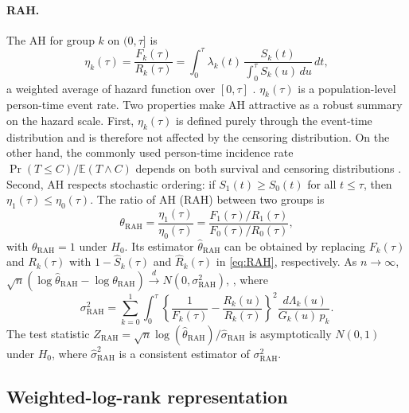 \documentclass[12pt]{article}
\newcommand{\RAH}{\mathrm{RAH}}
\newcommand{\dd}{\,d}
\begin{document}
\paragraph{RAH.}
The AH for group $k$ on $(0,\tau]$ is
\begin{equation*}\label{eq:AH}
  \eta_k(\tau)=\frac{F_k(\tau)}{R_k(\tau)}
              =\int_0^\tau\lambda_k(t)\,
               \frac{S_k(t)}{\int_0^\tau S_k(u)\dd u}\dd t,
\end{equation*}
a weighted average of hazard function over $[0, \tau]$ \citep{Uno2023}.
$\eta_k(\tau)$ is a population-level person-time event rate.
Two properties make
AH attractive as a robust summary on the hazard scale.  First, $\eta_k(\tau)$ is defined purely through the event-time distribution
and is therefore not affected by the censoring distribution. On the other hand, the commonly used person-time incidence rate $\Pr(T\le C)/\mathbb{E}(T\wedge C)$ depends on both survival and censoring distributions \citep{Uno2023}.
Second, AH respects stochastic ordering: if $S_1(t)\ge S_0(t)$ for all
$t\le\tau$, then $\eta_1(\tau)\le\eta_0(\tau)$.
The ratio of AH (RAH) between two groups is
\begin{equation}\label{eq:RAH}
  \theta_{\RAH}
    =\frac{\eta_1(\tau)}{\eta_0(\tau)}
    =\frac{F_1(\tau)/R_1(\tau)}{F_0(\tau)/R_0(\tau)},
\end{equation}
with $\theta_{\RAH}=1$ under $H_0$.  Its estimator $\hat\theta_{\RAH}$ can be obtained by
replacing $F_k(\tau)$ and $R_k(\tau)$ with $1-\hat{S}_k(\tau)$ and $\hat R_k(\tau)$ in \eqref{eq:RAH}, respectively. As $n \to \infty$, $\sqrt{n}(\log\hat\theta_{\RAH}-\log\theta_{\RAH})\xrightarrow{d}N(0,\sigma_{\RAH}^2)$, \citep{Uno2023},
where
\begin{equation}\label{eq:var-RAH}
  \sigma_{\RAH}^2
    =\sum_{k=0}^{1}
     \int_0^\tau
     \!\left\{\frac{1}{F_k(\tau)}-\frac{R_k(u)}{R_k(\tau)}\right\}^{\!2}
     \frac{\dd\Lambda_k(u)}{G_k(u)\,p_k}.
\end{equation}
The test statistic $Z_{\RAH}=\sqrt{n}\log(\hat\theta_{\RAH})/\hat\sigma_{\RAH}$
is asymptotically $N(0,1)$ under $H_0$, where $\hat{\sigma}_{\RAH}^2$ is a consistent estimator of $\sigma^2_{\RAH}.$

\subsection{Weighted-log-rank representation}
\label{sec:wlr}
\end{document}
